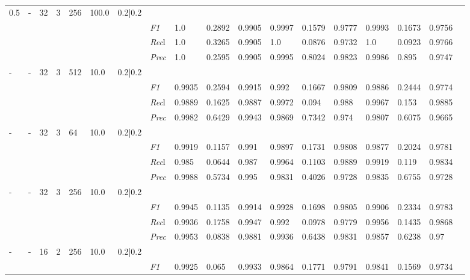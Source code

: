 \begin{table}[]
\begin{tabularx}{\textwidth}{XXXXXXX|X|XXX|XXX|XXXX}
    0.5 & - & 32 & 3 & 256 &100.0 & 0.2|0.2 & & & & & & & & & \\
    & & & & & & & \textit{F1} & 1.0 & 0.2892 & 0.9905 & 0.9997 & 0.1579        & 0.9777        & 0.9993        & 0.1673        & 0.9756        \\
    & & & & & & & \textit{Rec}l & 1.0 & 0.3265 & 0.9905    & 1.0 & 0.0876    & 0.9732    & 1.0    & 0.0923    & 0.9766    \\
    & & & & & & & \textit{Prec} & 1.0 & 0.2595 & 0.9905 & 0.9995 & 0.8024 & 0.9823 & 0.9986 & 0.895 & 0.9747 \\ \midrule
    - & - & 32 & 3 & 512 &10.0 & 0.2|0.2 & & & & & & & & & \\
    & & & & & & & \textit{F1} & 0.9935 & 0.2594 & 0.9915 & 0.992 & 0.1667        & 0.9809        & 0.9886        & 0.2444        & 0.9774        \\
    & & & & & & & \textit{Rec}l & 0.9889 & 0.1625 & 0.9887    & 0.9972 & 0.094    & 0.988    & 0.9967    & 0.153    & 0.9885    \\
    & & & & & & & \textit{Prec} & 0.9982 & 0.6429 & 0.9943 & 0.9869 & 0.7342 & 0.974 & 0.9807 & 0.6075 & 0.9665 \\ \midrule
    - & - & 32 & 3 & 64 &10.0 & 0.2|0.2 & & & & & & & & & \\
    & & & & & & & \textit{F1} & 0.9919 & 0.1157 & 0.991 & 0.9897 & 0.1731        & 0.9808        & 0.9877        & 0.2024        & 0.9781        \\
    & & & & & & & \textit{Rec}l & 0.985 & 0.0644 & 0.987    & 0.9964 & 0.1103    & 0.9889    & 0.9919    & 0.119    & 0.9834    \\
    & & & & & & & \textit{Prec} & 0.9988 & 0.5734 & 0.995 & 0.9831 & 0.4026 & 0.9728 & 0.9835 & 0.6755 & 0.9728 \\ \midrule
    - & - & 32 & 3 & 256 &10.0 & 0.2|0.2 & & & & & & & & & \\
    & & & & & & & \textit{F1} & 0.9945 & 0.1135 & 0.9914 & 0.9928 & 0.1698        & 0.9805        & 0.9906        & 0.2334        & 0.9783        \\
    & & & & & & & \textit{Rec}l & 0.9936 & 0.1758 & 0.9947    & 0.992 & 0.0978    & 0.9779    & 0.9956    & 0.1435    & 0.9868    \\
    & & & & & & & \textit{Prec} & 0.9953 & 0.0838 & 0.9881 & 0.9936 & 0.6438 & 0.9831 & 0.9857 & 0.6238 & 0.97 \\ \midrule
    - & - & 16 & 2 & 256 &10.0 & 0.2|0.2 & & & & & & & & & \\
    & & & & & & & \textit{F1} & 0.9925 & 0.065 & 0.9933 & 0.9864 & 0.1771        & 0.9791        & 0.9841        & 0.1569        & 0.9734        \\

\end{tabularx}
\end{table}

